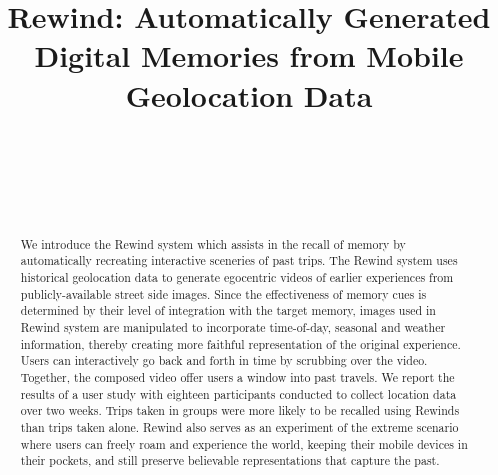 \documentclass{sigchi}
\begin{document}
\title{Rewind: Automatically Generated\\Digital Memories from Mobile Geolocation Data}

\author{
  \alignauthor {~}\\
    \affaddr{~}\\
    \affaddr{~}\\
    \email{~}\\
}


\maketitle


\begin{abstract}
We introduce the Rewind system which assists in the recall of memory by automatically recreating interactive sceneries of past trips. The Rewind system uses historical geolocation data to generate egocentric videos of earlier experiences from publicly-available street side images. Since the effectiveness of memory cues is determined by their level of integration with the target memory, images used in Rewind system are manipulated to incorporate time-of-day, seasonal and weather information, thereby creating more faithful representation of the original experience. Users can interactively go back and forth in time by scrubbing over the video. Together, the composed video offer users a window into past travels. We report the results of a user study with eighteen participants conducted to collect location data over two weeks. Trips taken in groups were more likely to be recalled using Rewinds than trips taken alone. Rewind also serves as an experiment of the extreme scenario where users can freely roam and experience the world, keeping their mobile devices in their pockets, and still preserve believable representations that capture the past.
\end{abstract}
\end{document}
